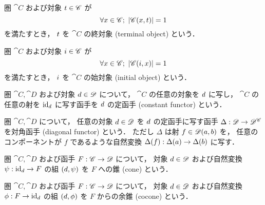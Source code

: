 \documentclass[titlepage]{ltjsreport}
\begin{document}
\begin{definition}[終対象]
  圏 $\cat{C}$ および対象 $\obj{t}\in\objs{\cat{C}}$ が
  \begin{equation}
    \forall\obj{x}\in\objs{\cat{C}};\ |\mrps{\cat{C}}{\obj{x}}{\obj{t}}|=1
  \end{equation}
  を満たすとき，
  $\obj{t}$ を $\cat{C}$ の終対象 (terminal object) という．
\end{definition}

\begin{definition}[始対象]
  圏 $\cat{C}$ および対象 $\obj{i}\in\objs{\cat{C}}$ が
  \begin{equation}
    \forall\obj{x}\in\objs{\cat{C}};\ |\mrps{\cat{C}}{\obj{i}}{\obj{x}}|=1
  \end{equation}
  を満たすとき，
  $\obj{i}$ を $\cat{C}$ の始対象 (initial object) という．
\end{definition}

\begin{center}
  
\end{center}

\begin{definition}[定函手]
  圏 $\cat{C},\cat{D}$ および対象 $\obj{d}\in\objs{\cat{D}}$ について，
  $\cat{C}$ の任意の対象を $\obj{d}$ に写し，
  $\cat{C}$ の任意の射を $\id{\obj{d}}$ に写す函手を
  $\obj{d}$ の定函手 (constant functor) という．
\end{definition}

\begin{definition}[対角函手]
  圏 $\cat{C},\cat{D}$ について，
  任意の対象 $\obj{d}\in\objs{\cat{D}}$ を $\obj{d}$ の定函手に写す函手
  ${\Delta}:{\mathscr{D}}\to{\mathscr{D}^{\mathscr{C}}}$ を対角函手 (diagonal functor) という．
  ただし $\Delta$ は射 $f\in\mathscr{D}(a,b)$ を，
  任意のコンポーネントが $f$ であるような自然変換
  ${\Delta(f)}:{\Delta(a)}\to{\Delta(b)}$ に写す．
\end{definition}

\begin{definition}[錐]
  圏 $\cat{C},\cat{D}$ および函手 ${F}:{\mathscr{C}}\to{\mathscr{D}}$ について，
  対象 $\obj{d}\in\objs{\cat{D}}$ および自然変換 $\mrp{\psi}{\id{\obj{d}}}{F}$
  の組 $(\obj{d},\psi)$ を $F$ への錐 (cone) という．
\end{definition}

\begin{definition}[余錐]
  圏 $\cat{C},\cat{D}$ および函手 ${F}:{\mathscr{C}}\to{\mathscr{D}}$ について，
  対象 $\obj{d}\in\objs{\cat{D}}$ および自然変換 $\mrp{\phi}{F}{\id{\obj{d}}}$
  の組 $(\obj{d},\phi)$ を $F$ からの余錐 (cocone) という．
\end{definition}
\end{document}
